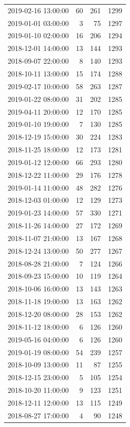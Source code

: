 \begin{tabular}{lrrr}
2019-02-16 13:00:00 & 60 & 261 & 1299 \\
2019-01-01 03:00:00 & 3 & 75 & 1297 \\
2019-01-10 02:00:00 & 16 & 206 & 1294 \\
2018-12-01 14:00:00 & 13 & 144 & 1293 \\
2018-09-07 22:00:00 & 8 & 140 & 1293 \\
2018-10-11 13:00:00 & 15 & 174 & 1288 \\
2019-02-17 10:00:00 & 58 & 263 & 1287 \\
2019-01-22 08:00:00 & 31 & 202 & 1285 \\
2019-04-11 20:00:00 & 12 & 170 & 1285 \\
2019-01-10 19:00:00 & 7 & 130 & 1285 \\
2018-12-19 15:00:00 & 30 & 224 & 1283 \\
2018-11-25 18:00:00 & 12 & 173 & 1281 \\
2019-01-12 12:00:00 & 66 & 293 & 1280 \\
2018-12-22 11:00:00 & 29 & 176 & 1278 \\
2019-01-14 11:00:00 & 48 & 282 & 1276 \\
2018-12-03 01:00:00 & 12 & 129 & 1273 \\
2019-01-23 14:00:00 & 57 & 330 & 1271 \\
2018-11-26 14:00:00 & 27 & 172 & 1269 \\
2018-11-07 21:00:00 & 13 & 167 & 1268 \\
2018-12-24 13:00:00 & 50 & 277 & 1267 \\
2018-08-28 21:00:00 & 7 & 124 & 1266 \\
2018-09-23 15:00:00 & 10 & 119 & 1264 \\
2018-10-06 16:00:00 & 13 & 143 & 1263 \\
2018-11-18 19:00:00 & 13 & 163 & 1262 \\
2018-12-20 08:00:00 & 28 & 153 & 1262 \\
2018-11-12 18:00:00 & 6 & 126 & 1260 \\
2019-05-16 04:00:00 & 6 & 126 & 1260 \\
2019-01-19 08:00:00 & 54 & 239 & 1257 \\
2018-10-09 13:00:00 & 11 & 87 & 1255 \\
2018-12-15 23:00:00 & 5 & 105 & 1254 \\
2018-10-20 11:00:00 & 9 & 123 & 1251 \\
2018-12-11 12:00:00 & 13 & 115 & 1249 \\
2018-08-27 17:00:00 & 4 & 90 & 1248 \\

\end{tabular}
